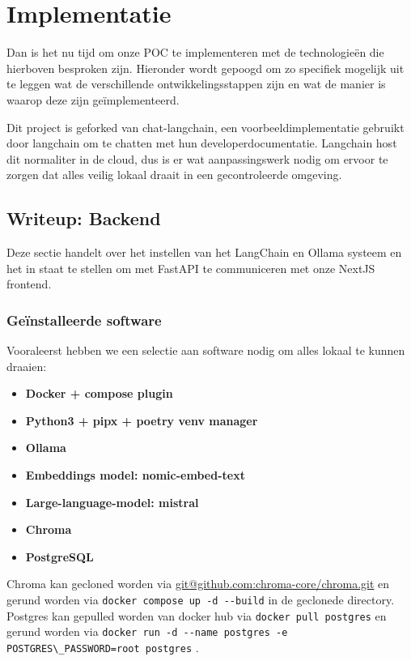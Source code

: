 \chapter{Implementatie}
\label{ch:implementation}
Dan is het nu tijd om onze POC te implementeren met de technologieën die hierboven besproken zijn.
Hieronder wordt gepoogd om zo specifiek mogelijk uit te leggen wat de verschillende ontwikkelingsstappen zijn en wat de manier is waarop deze zijn geïmplementeerd.

Dit project is geforked van chat-langchain, een voorbeeldimplementatie gebruikt door langchain om te chatten met hun developerdocumentatie.
Langchain host dit normaliter in de cloud, dus is er wat aanpassingswerk nodig om ervoor te zorgen dat alles veilig lokaal draait in een gecontroleerde omgeving.

\section{Writeup: Backend}
Deze sectie handelt over het instellen van het LangChain en Ollama systeem en het in staat te stellen om met FastAPI te communiceren met onze NextJS frontend.

\subsection{Geïnstalleerde software}
Vooraleerst hebben we een selectie aan software nodig om alles lokaal te kunnen draaien:
\begin{itemize}
	\item \textbf{Docker + compose plugin}
	\item \textbf{Python3 + pipx + poetry venv manager}
	\item \textbf{Ollama}
	\item \textbf{Embeddings model: nomic-embed-text}
	\item \textbf{Large-language-model: mistral}
	\item \textbf{Chroma}
	\item \textbf{PostgreSQL}
\end{itemize}

Chroma kan gecloned worden via \url{git@github.com:chroma-core/chroma.git} en gerund worden via \lstinline{docker compose up -d --build} in de geclonede directory. \\
Postgres kan gepulled worden van docker hub via \lstinline{docker pull postgres} en gerund worden via \lstinline{docker run -d --name postgres -e POSTGRES\_PASSWORD=root postgres} . \\

